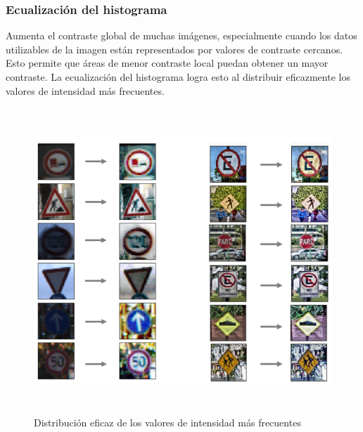 		\vspace{1.5em}
		\subsubsection{Ecualización del histograma}
			Aumenta el contraste global de muchas imágenes, especialmente cuando los datos utilizables de la imagen están representados por valores de contraste cercanos. Esto permite que áreas de menor contraste local puedan obtener un mayor contraste. La ecualización del histograma logra esto al distribuir eficazmente los valores de intensidad más frecuentes.

			\begin{figure}[H]
				\begin{center}
				\includegraphics[height=11.5cm]{images/desarrollo/Augment/equalize_hist2_wo_Norm_woRepetition2}
				\end{center}
				\begin{center}
				\caption{\small{Distribución eficaz de los valores de intensidad más frecuentes}}
				{\small{\fontsize{10}{16.8}\selectfont {Fuente: Elaboración propia}}}
				\end{center}
				\vspace{-1.5em}
			\end{figure}
		
		

